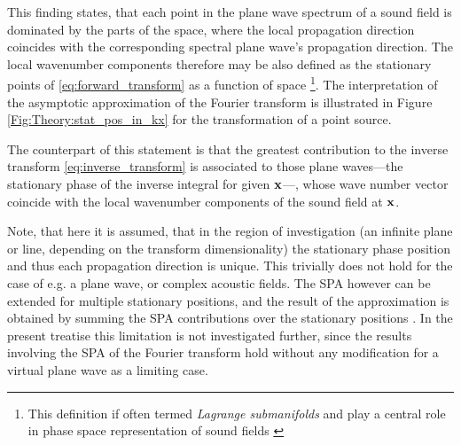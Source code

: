 This finding states, that each point in the plane wave spectrum of a sound field is dominated by the parts of the space, where the local propagation direction coincides with the corresponding spectral plane wave's propagation direction.
The local wavenumber components therefore may be also defined as the stationary points of \eqref{eq:forward_transform} as a function of space \footnote{This definition if often termed \emph{Lagrange submanifolds} and play a central role in phase space representation of sound fields \cite{Arnold1995, Tinkelman2005, Steinberg1993}}.
The interpretation of the asymptotic approximation of the Fourier transform is illustrated in Figure \ref{Fig:Theory:stat_pos_in_kx} for the transformation of a point source.

The counterpart of this statement is that the greatest contribution to the inverse transform \eqref{eq:inverse_transform} is associated to those plane waves---the stationary phase of the inverse integral for given $\mathbf{x}$---, whose wave number vector coincide with the local wavenumber components of the sound field at $\mathbf{x}$.

Note, that here it is assumed, that in the region of investigation (an infinite plane or line, depending on the transform dimensionality) the stationary phase position and thus each propagation direction is unique.
This trivially does not hold for the case of e.g. a plane wave, or complex acoustic fields.
The SPA however can be extended for multiple stationary positions, and the result of the approximation is obtained by summing the SPA contributions over the stationary positions \cite[p. 129]{Bleistein2000}.
In the present treatise this limitation is not investigated further, since the results involving the SPA of the Fourier transform hold without any modification for a virtual plane wave as a limiting case. 	

